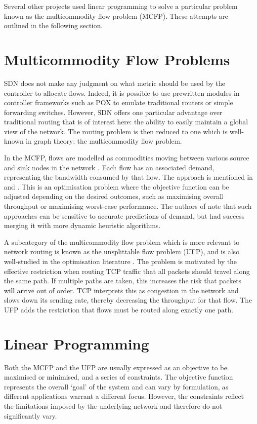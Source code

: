 Several other projects used linear programming to solve a particular problem known as the multicommodity flow problem (MCFP). These attempts are outlined in the following section.

\section{Multicommodity Flow Problems}
\label{sec:mcf}

SDN does not make any judgment on what metric should be used by the controller to allocate flows. Indeed, it is possible to use prewritten modules in controller frameworks such as POX \cite{onl:pox} to emulate traditional routers or simple forwarding switches. However, SDN offers one particular advantage over traditional routing that is of interest here: the ability to easily maintain a global view of the network. The routing problem is then reduced to one which is well-known in graph theory: the multicommodity flow problem.

In the MCFP, flows are modelled as commodities moving between various source and sink nodes in the network \cite[pp. 862--863]{cormen:algorithms}. Each flow has an associated demand, representing the bandwidth consumed by that flow. The approach is mentioned in \cite{wellons:augmenting} and \cite{dai:dynamic}. This is an optimisation problem where the objective function can be adjusted depending on the desired outcomes, such as maximising overall throughput or maximising worst-case performance. The authors of \cite{wellons:augmenting} note that such approaches can be sensitive to accurate predictions of demand, but had success merging it with more dynamic heuristic algorithms.

A subcategory of the multicommodity flow problem which is more relevant to network routing is known as the unsplittable flow problem (UFP), and is also well-studied in the optimisation literature \cite{anag:mazing, bonsma:ufp, chakrabarti:ufp, walkowiak:residual}. The problem is motivated by the effective restriction when routing TCP traffic that all packets should travel along the same path. If multiple paths are taken, this increases the risk that packets will arrive out of order. TCP interprets this as congestion in the network and slows down its sending rate, thereby decreasing the throughput for that flow. The UFP adds the restriction that flows must be routed along exactly one path.

\section{Linear Programming}
Both the MCFP and the UFP are usually expressed as an objective to be maximised or minimised, and a series of constraints. The objective function represents the overall `goal' of the system and can vary by formulation, as different applications warrant a different focus. However, the constraints reflect the limitations imposed by the underlying network and therefore do not significantly vary.

